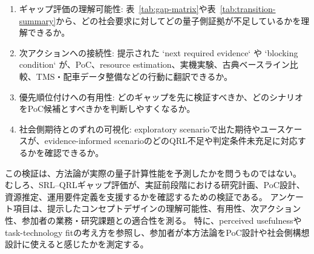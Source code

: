 \begin{enumerate}
  \item ギャップ評価の理解可能性: 表~\ref{tab:gap-matrix}や表~\ref{tab:transition-summary}から、どの社会要求に対してどの量子側証拠が不足しているかを理解できるか。
  \item 次アクションへの接続性: 提示された `next required evidence` や `blocking condition` が、PoC、resource estimation、実機実験、古典ベースライン比較、TMS・配車データ整備などの行動に翻訳できるか。
  \item 優先順位付けへの有用性: どのギャップを先に検証すべきか、どのシナリオをPoC候補とすべきかを判断しやすくなるか。
  \item 社会側期待とのずれの可視化: exploratory scenarioで出た期待やユースケースが、evidence-informed scenarioのどのQRL不足や判定条件未充足に対応するかを確認できるか。
\end{enumerate}

この検証は、方法論が実際の量子計算性能を予測したかを問うものではない。
むしろ、SRL--QRLギャップ評価が、実証前段階における研究計画、PoC設計、資源推定、運用要件定義を支援するかを確認するための検証である。
アンケート項目は、提示したコンセプトデザインの理解可能性、有用性、次アクション性、参加者の業務・研究課題との適合性を測る。
特に、perceived usefulnessやtask-technology fitの考え方を参照し、参加者が本方法論をPoC設計や社会側構想設計に使えると感じたかを測定する\cite{davis1989tam,goodhue1995ttf}。
